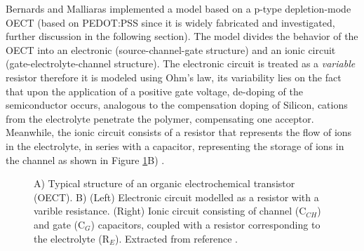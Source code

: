 Bernards and Malliaras implemented a model based on a p-type depletion-mode OECT (based on PEDOT:PSS since it is widely fabricated and investigated, further discussion in the following section). The model divides the behavior of the OECT into an electronic (source-channel-gate structure) and an ionic circuit (gate-electrolyte-channel structure). The electronic circuit is treated as a \textit{variable} resistor therefore it is modeled using Ohm's law, its variability lies on the fact that upon the application of a positive gate voltage, de-doping of the semiconductor occurs, analogous to the compensation doping of Silicon, cations from the electrolyte penetrate the polymer, compensating one acceptor. Meanwhile, the ionic circuit consists of a resistor that represents the flow of ions in the electrolyte, in series with a capacitor, representing the storage of ions in the channel as shown in Figure \ref{fig:bernard}B)  \cite{rivnayOrganicElectrochemicalTransistors2018}\cite{bernardsSteadyStateTransientBehavior2007}. 

\begin{figure}[h]
	\centering
	\hspace{2em}
	\caption[Typical OECT structure and circuit model]{A) Typical structure of an organic electrochemical transistor (OECT). B) (Left) Electronic circuit modelled as a resistor with a varible resistance. (Right) Ionic circuit consisting of channel (C$_{CH}$) and gate (C$_{G}$) capacitors, coupled with a resistor corresponding to the electrolyte (R$_{E}$). Extracted from reference \cite{rivnayOrganicElectrochemicalTransistors2018}.}
	\label{fig:bernard}
\end{figure}



